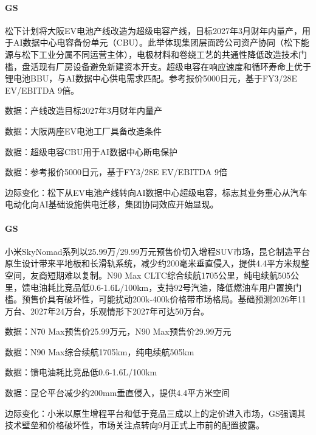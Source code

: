 \documentclass[11pt]{ctexart}
\begin{document}
\paragraph{GS} 松下计划将大阪EV电池产线改造为超级电容产线，目标2027年3月财年内量产，用于AI数据中心电容备份单元（CBU）。此举体现集团层面跨公司资产协同（松下能源与松下工业分属不同运营主体），电极材料和卷绕工艺的共通性降低改造技术门槛，盘活现有厂房设备避免新建资本开支。超级电容在响应速度和循环寿命上优于锂电池BBU，与AI数据中心供电需求匹配。参考报价5000日元，基于FY3/28E EV/EBITDA 9倍。
{\small\color{refgray}数据：产线改造目标2027年3月财年内量产\par}
{\small\color{refgray}数据：大阪两座EV电池工厂具备改造条件\par}
{\small\color{refgray}数据：超级电容CBU用于AI数据中心断电保护\par}
{\small\color{refgray}数据：参考报价5000日元，基于FY3/28E EV/EBITDA 9倍\par}
{\small\color{refgray}边际变化：松下从EV电池产线转向AI数据中心超级电容，标志其业务重心从汽车电动化向AI基础设施供电迁移，集团协同效应开始显现。\par}
\paragraph{GS} 小米SkyNomad系列以25.99万/29.99万元预售价切入增程SUV市场，昆仑制造平台原生设计带来平地板和长滑轨系统，减少约200毫米垂直侵入，提供4.4平方米规整空间，友商短期难以复制。N90 Max CLTC综合续航1705公里，纯电续航505公里，馈电油耗比竞品低0.6-1.6L/100km，支持92号汽油，降低燃油车用户置换门槛。预售价具有破坏性，可能扰动200k-400k价格带市场格局。基础预测2026年11万台、2027年24万台，乐观情形下2027年可达50万台。
{\small\color{refgray}数据：N70 Max预售价25.99万元，N90 Max预售价29.99万元\par}
{\small\color{refgray}数据：N90 Max综合续航1705km，纯电续航505km\par}
{\small\color{refgray}数据：馈电油耗比竞品低0.6-1.6L/100km\par}
{\small\color{refgray}数据：昆仑平台减少约200mm垂直侵入，提供4.4平方米空间\par}
{\small\color{refgray}边际变化：小米以原生增程平台和低于竞品三成以上的定价进入市场，GS强调其技术壁垒和价格破坏性，市场关注点转向9月正式上市前的配置披露。\par}
\end{document}
